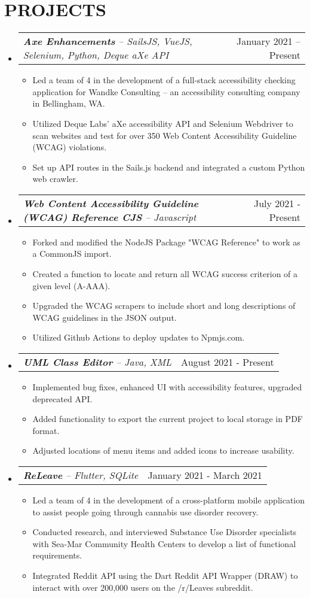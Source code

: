 \documentclass[letterpaper,11pt]{article}
\makeatletter
\newcommand{\resumeItem}[1]{
  \item\small{
    {#1 \vspace{-1pt}}
  }
}
\newcommand{\resumeProjectHeading}[2]{
    \item
    \begin{tabular*}{\textwidth}{l@{\extracolsep{\fill}}r}
        \textit{\small#1} & {\color{dark-grey}\small #2}\vspace{2pt} \\
    \end{tabular*}\vspace{-5pt}
}
\newcommand{\resumeSubHeadingListStart}{\begin{itemize}[leftmargin=0in, label={}]}
\newcommand{\resumeSubHeadingListEnd}{\end{itemize}}
\newcommand{\resumeItemListStart}{\begin{itemize}}
\newcommand{\resumeItemListEnd}{\end{itemize}\vspace{0pt}}
\makeatother
\begin{document}
\section{PROJECTS}
    \resumeSubHeadingListStart
      \resumeProjectHeading
      {\textbf{Axe Enhancements} -- SailsJS, VueJS, Selenium, Python, Deque aXe API}{January 2021 -- Present}
          \resumeItemListStart
            \resumeItem{Led a team of 4 in the development of a full-stack accessibility checking application for Wandke Consulting -- an accessibility consulting company in Bellingham, WA.}
            \resumeItem{Utilized Deque Labs’ aXe accessibility API and Selenium Webdriver to scan websites and test for over 350 Web Content Accessibility Guideline (WCAG) violations.}
            \resumeItem{Set up API routes in the Sails.js backend and integrated a custom Python web crawler.}
          \resumeItemListEnd
          
        \resumeProjectHeading
         {\textbf{Web Content Accessibility Guideline (WCAG) Reference CJS} -- Javascript}{July 2021 - Present}
          \resumeItemListStart
            \resumeItem{Forked and modified the NodeJS Package "WCAG Reference" to work as a CommonJS import.}
            \resumeItem{Created a function to locate and return all WCAG success criterion of a given level (A-AAA).}
            \resumeItem{Upgraded the WCAG scrapers to include short and long descriptions of WCAG guidelines in the JSON output.}
            \resumeItem{Utilized Github Actions to deploy updates to Npmjs.com.}
          \resumeItemListEnd
          
        \resumeProjectHeading
          {\textbf{UML Class Editor} -- Java, XML}{August 2021 - Present}  
          \resumeItemListStart
            \resumeItem{Implemented bug fixes, enhanced UI with accessibility features, upgraded deprecated API.}
            \resumeItem{Added functionality to export the current project to local storage in PDF format.}
            \resumeItem{Adjusted locations of menu items and added icons to increase usability.}
          \resumeItemListEnd
          
        \resumeProjectHeading
          {\textbf{ReLeave} -- Flutter, SQLite}{January 2021 - March 2021}  
          \resumeItemListStart
            \resumeItem{Led a team of 4 in the development of a cross-platform mobile application to assist people going through cannabis use disorder recovery.}
            \resumeItem{Conducted research, and interviewed Substance Use Disorder specialists with Sea-Mar Community Health Centers to develop a list of functional requirements.}
            \resumeItem{Integrated Reddit API using the Dart Reddit API Wrapper (DRAW) to interact with over 200,000 users on the /r/Leaves subreddit.}
          \resumeItemListEnd
    \resumeSubHeadingListEnd
\end{document}
